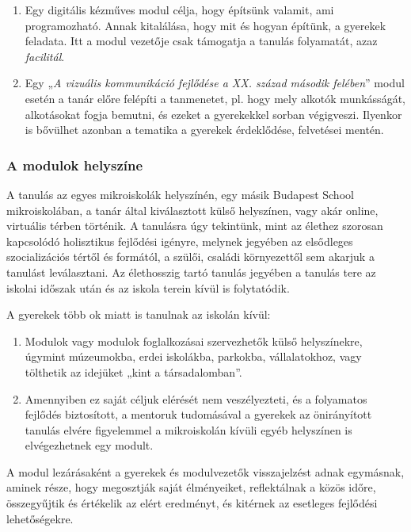\begin{enumerate}
      \item Egy digitális kézműves modul célja, hogy építsünk valamit, ami programozható. Annak kitalálása, hogy mit és hogyan építünk, a gyerekek feladata. Itt a modul vezetője csak támogatja a tanulás folyamatát, azaz \emph{facilitál}.

      \item Egy „\emph{A vizuális kommunikáció fejlődése a XX. század második felében}'' modul esetén a tanár előre felépíti a tanmenetet, pl. hogy mely alkotók munkásságát, alkotásokat fogja bemutni, és ezeket a gyerekekkel sorban végigveszi. Ilyenkor is bővülhet azonban a tematika a gyerekek érdeklődése, felvetései mentén.

\end{enumerate}

\subsubsection{A modulok helyszíne}

A tanulás az egyes mikroiskolák helyszínén, egy másik Budapest School mikroiskolában, a tanár által kiválasztott külső helyszínen, vagy akár online, virtuális térben történik. A tanulásra úgy tekintünk, mint az élethez szorosan kapcsolódó holisztikus fejlődési igényre, melynek jegyében az elsődleges szocializációs tértől és formától, a szülői, családi környezettől sem akarjuk a tanulást leválasztani. Az élethosszig tartó tanulás jegyében a tanulás tere az iskolai időszak után és az iskola terein kívül is folytatódik.

A gyerekek több ok miatt is tanulnak az iskolán kívül:

\begin{enumerate}
      \item Modulok vagy modulok foglalkozásai szervezhetők külső helyszínekre, úgymint múzeumokba, erdei iskolákba, parkokba, vállalatokhoz, vagy tölthetik az idejüket „kint a társadalomban''.

      \item Amennyiben ez saját céljuk elérését nem veszélyezteti, és a folyamatos fejlődés biztosított, a mentoruk tudomásával a gyerekek az önirányított tanulás elvére figyelemmel a mikroiskolán kívüli egyéb helyszínen is elvégezhetnek egy modult.
\end{enumerate}

A modul lezárásaként a gyerekek és modulvezetők visszajelzést adnak egymásnak, aminek része, hogy megosztják saját élményeiket, reflektálnak a közös időre, összegyűjtik és értékelik az elért eredményt, és kitérnek az esetleges fejlődési lehetőségekre.

